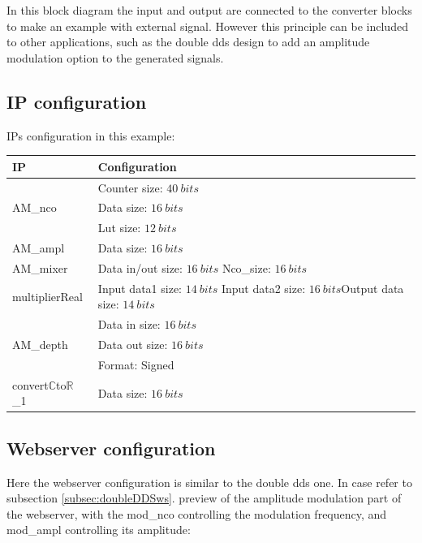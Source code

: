 \documentclass[12pt,oneside]{article}
\begin{document}
In this block diagram the input and output are connected to the converter blocks to make an example with external signal. However this principle can be included to other applications, such as the double dds design to add an amplitude modulation option to the generated signals.
\vspace{-0.3cm}
\subsection{IP configuration}
\vspace{-0cm}
IPs configuration in this example:
\begin{center}
	\begin{tabular}{|>{\centering\arraybackslash}m{.3\linewidth} | >{\centering\arraybackslash}m{.3\linewidth} |}
		\hline
		IP & Configuration \\
		\hline
		& Counter size: $40~bits$\\ AM\_nco &Data size: $16~bits$\\ &Lut size: $12~bits$ \\
		\hline
		AM\_ampl&Data size: $16~bits$ \\
		\hline
		AM\_mixer&Data in/out size: $16~bits$ \newline Nco\_size: $16~bits$ \\
		\hdashline
		multiplierReal&Input data1 size: $14~bits$ \newline Input data2 size: $16~bits$\newline Output data size: $14~bits$ \\
		\hline
		& Data in size: $16~bits$\\AM\_depth & Data out size: $16~bits$\\ &Format: Signed \\
		\hline
		convert$\mathbb{C}$to$\mathbb{R}$\_1&Data size: $16~bits$\\
		\hline
	\end{tabular}
\end{center}
\vspace{-0.2cm}
\subsection{Webserver configuration}

Here the webserver configuration is similar to the double dds one. In case refer to subsection \ref{subsec:doubleDDSws}. preview of the amplitude modulation part of the webserver, with the mod\_nco controlling the modulation frequency, and mod\_ampl controlling its amplitude:
\end{document}
